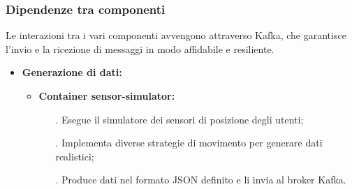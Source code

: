 \documentclass[10pt]{article}
\begin{document}
        \subsubsection{Dipendenze tra componenti}
        Le interazioni tra i vari componenti avvengono attraverso Kafka, che garantisce l'invio e la ricezione di messaggi in modo affidabile e resiliente.

\begin{itemize}
    \item \textbf{Generazione di dati:}
    \begin{itemize}
        \item \textbf{Container sensor-simulator:}
        \begin{itemize}
            \item[.] Esegue il simulatore dei sensori di posizione degli utenti;
            \item[.] Implementa diverse strategie di movimento per generare dati realistici;
            \item[.] Produce dati nel formato JSON definito e li invia al broker Kafka.
        \end{itemize}
    \end{itemize}
    

\end{itemize}
\end{document}
